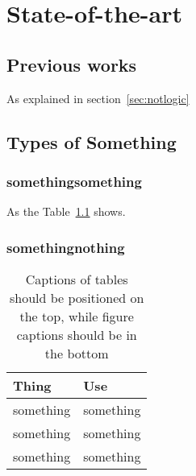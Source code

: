 \chapter{State-of-the-art}
\label{ch:stateart}




\section{Previous works}
\label{sec:prevworks}
	
As explained in section~\ref{sec:notlogic}
	
	
\section{Types of Something}
\label{sec:typesome}

		
\subsection{somethingsomething}
\label{subsec:somesome}
		
As the Table~\ref{tb:typesomething} shows.
		
\subsection{somethingnothing}
\label{subsec:somenoth}
		
\begin{table}[]
	\centering
	\label{tb:typesomething} %
	\caption{Captions of tables should be positioned on the top, while figure captions should be in the bottom}
	\begin{tabular}{ll}
		\hline
		\textbf{Thing} & \textbf{Use} \\
		\hline
		something & something \\
		something & something \\
		something & something \\
		\hline
	\end{tabular}
	\end{table}
		
